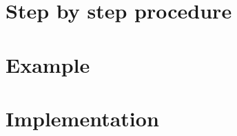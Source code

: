 \documentclass[titlepage]{article}%
\begin{document}
\section{Step by step procedure} %
\label{sec:step_by_step_procedure}






\section{Example} %
\label{sec:example}






\section{Implementation} %
\label{sec:implementation}








\end{document}
